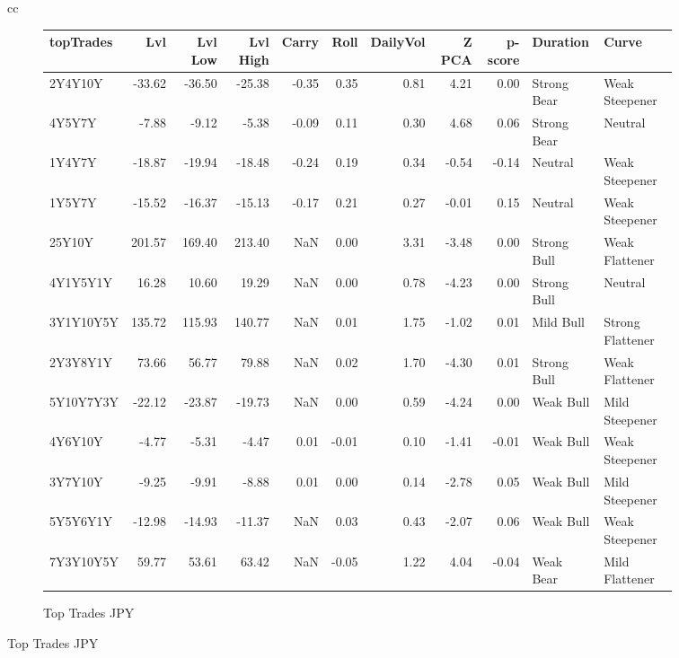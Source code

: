\documentclass[a4paper,twoside]{report}
\begin{document}
\begin{figure}[htbp]
\begin{tabular}[c]{cc}
\begin{subfigure}[c]{0.5\textwidth}
\caption{Top Trades JPY}
\label{fig:TopTrades JPY}
\begin{adjustbox}{max width=\textwidth}
\begin{tabular}{lrrrrrrrrll}
\hline
 topTrades &     Lvl &  Lvl Low &  Lvl High &  Carry &  Roll &  DailyVol &  Z PCA &  p-score &     Duration &             Curve \\
\hline
   2Y4Y10Y &  -33.62 &   -36.50 &    -25.38 &  -0.35 &  0.35 &      0.81 &   4.21 &     0.00 &  Strong Bear &    Weak Steepener \\
    4Y5Y7Y &   -7.88 &    -9.12 &     -5.38 &  -0.09 &  0.11 &      0.30 &   4.68 &     0.06 &  Strong Bear &           Neutral \\
    1Y4Y7Y &  -18.87 &   -19.94 &    -18.48 &  -0.24 &  0.19 &      0.34 &  -0.54 &    -0.14 &      Neutral &    Weak Steepener \\
    1Y5Y7Y &  -15.52 &   -16.37 &    -15.13 &  -0.17 &  0.21 &      0.27 &  -0.01 &     0.15 &      Neutral &    Weak Steepener \\
    25Y10Y &  201.57 &   169.40 &    213.40 &    NaN &  0.00 &      3.31 &  -3.48 &     0.00 &  Strong Bull &    Weak Flattener \\
  4Y1Y5Y1Y &   16.28 &    10.60 &     19.29 &    NaN &  0.00 &      0.78 &  -4.23 &     0.00 &  Strong Bull &           Neutral \\
 3Y1Y10Y5Y &  135.72 &   115.93 &    140.77 &    NaN &  0.01 &      1.75 &  -1.02 &     0.01 &    Mild Bull &  Strong Flattener \\
  2Y3Y8Y1Y &   73.66 &    56.77 &     79.88 &    NaN &  0.02 &      1.70 &  -4.30 &     0.01 &  Strong Bull &    Weak Flattener \\
 5Y10Y7Y3Y &  -22.12 &   -23.87 &    -19.73 &    NaN &  0.00 &      0.59 &  -4.24 &     0.00 &    Weak Bull &    Mild Steepener \\
   4Y6Y10Y &   -4.77 &    -5.31 &     -4.47 &   0.01 & -0.01 &      0.10 &  -1.41 &    -0.01 &    Weak Bull &    Weak Steepener \\
   3Y7Y10Y &   -9.25 &    -9.91 &     -8.88 &   0.01 &  0.00 &      0.14 &  -2.78 &     0.05 &    Weak Bull &    Mild Steepener \\
  5Y5Y6Y1Y &  -12.98 &   -14.93 &    -11.37 &    NaN &  0.03 &      0.43 &  -2.07 &     0.06 &    Weak Bull &    Weak Steepener \\
 7Y3Y10Y5Y &   59.77 &    53.61 &     63.42 &    NaN & -0.05 &      1.22 &   4.04 &    -0.04 &    Weak Bear &    Mild Flattener \\

\end{tabular}
\end{adjustbox}
\end{subfigure}
\end{tabular}
\end{figure}
\end{document}
